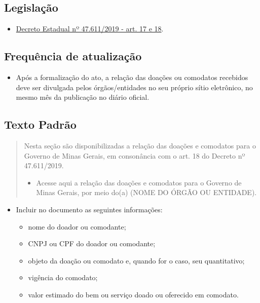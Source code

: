 \documentclass[
]{book}
\providecommand{\tightlist}{%
  \setlength{\itemsep}{0pt}\setlength{\parskip}{0pt}}
\begin{document}
\hypertarget{legislauxe7uxe3o-12}{%
\subsection{Legislação}\label{legislauxe7uxe3o-12}}

\begin{itemize}
\tightlist
\item
  \href{https://www.almg.gov.br/consulte/legislacao/completa/completa.html?tipo=DEC\&num=47611\&comp=\&ano=2019}{Decreto Estadual nº 47.611/2019 - art. 17 e 18}.
\end{itemize}

\hypertarget{frequuxeancia-de-atualizauxe7uxe3o-11}{%
\subsection{Frequência de atualização}\label{frequuxeancia-de-atualizauxe7uxe3o-11}}

\begin{itemize}
\tightlist
\item
  Após a formalização do ato, a relação das doações ou comodatos recebidos deve ser divulgada pelos órgãos/entidades no seu próprio sítio eletrônico, no mesmo mês da publicação no diário oficial.
\end{itemize}

\hypertarget{texto-padruxe3o-12}{%
\subsection{Texto Padrão}\label{texto-padruxe3o-12}}

\begin{quote}
Nesta seção são disponibilizadas a relação das doações e comodatos para o Governo de Minas Gerais, em consonância com o art. 18 do Decreto nº 47.611/2019.

\begin{itemize}
\tightlist
\item
  Acesse aqui a relação das doações e comodatos para o Governo de Minas Gerais, por meio do(a) (NOME DO ÓRGÃO OU ENTIDADE).
\end{itemize}
\end{quote}

\begin{itemize}
\tightlist
\item
  Incluir no documento as seguintes informações:

  \begin{itemize}
  \tightlist
  \item
    nome do doador ou comodante;
  \item
    CNPJ ou CPF do doador ou comodante;
  \item
    objeto da doação ou comodato e, quando for o caso, seu quantitativo;
  \item
    vigência do comodato;
  \item
    valor estimado do bem ou serviço doado ou oferecido em comodato.
  \end{itemize}
\end{itemize}
\end{document}
